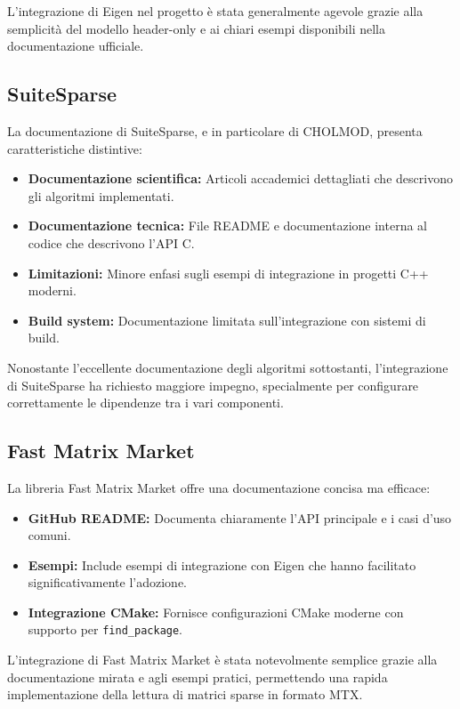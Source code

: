 L'integrazione di Eigen nel progetto è stata generalmente agevole grazie alla semplicità del modello header-only e ai chiari esempi 
disponibili nella documentazione ufficiale.

\subsection{SuiteSparse}

La documentazione di SuiteSparse, e in particolare di CHOLMOD, presenta caratteristiche distintive:

\begin{itemize}
    \item \textbf{Documentazione scientifica:} Articoli accademici dettagliati che descrivono gli algoritmi implementati.
    \item \textbf{Documentazione tecnica:} File README e documentazione interna al codice che descrivono l'API C.
    \item \textbf{Limitazioni:} Minore enfasi sugli esempi di integrazione in progetti C++ moderni.
    \item \textbf{Build system:} Documentazione limitata sull'integrazione con sistemi di build.
\end{itemize}

Nonostante l'eccellente documentazione degli algoritmi sottostanti, l'integrazione di SuiteSparse ha richiesto maggiore impegno, 
specialmente per configurare correttamente le dipendenze tra i vari componenti. \cite{SuiteSparse}

\subsection{Fast Matrix Market}

La libreria Fast Matrix Market offre una documentazione concisa ma efficace:

\begin{itemize}
    \item \textbf{GitHub README:} Documenta chiaramente l'API principale e i casi d'uso comuni.
    \item \textbf{Esempi:} Include esempi di integrazione con Eigen che hanno facilitato significativamente l'adozione.
    \item \textbf{Integrazione CMake:} Fornisce configurazioni CMake moderne con supporto per \texttt{find\_package}.
\end{itemize}

L'integrazione di Fast Matrix Market è stata notevolmente semplice grazie alla documentazione mirata e agli esempi pratici, 
permettendo una rapida implementazione della lettura di matrici sparse in formato MTX.

